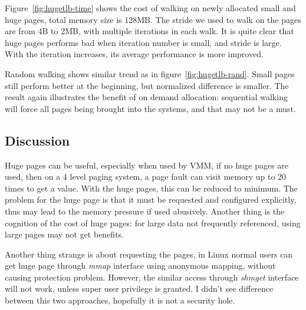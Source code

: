 Figure~\ref{fig:hugetlb-time} shows the cost of walking on newly allocated
small and huge pages, total memory size is 128MB. The stride we used to walk on
the pages are from 4B to 2MB, with multiple iterations in each walk. It is quite
clear that huge pages performs bad when iteration number is small, and stride
is large. With the iteration increases, its average performance is
more improved.

Random walking shows similar trend as in figure~\ref{fig:hugetlb-rand}. Small
pages still perform better at the beginning, but normalized difference is
smaller. The result again illustrates the benefit of on demand allocation:
sequential walking will force all pages being brought into the systems, and
that may not be a must.

\subsection{Discussion}
Huge pages can be useful, especially when used by VMM, if no huge pages are 
used, then on a 4 level paging system, a page fault can visit memory up to 20 times 
to get a value. With the huge pages, this can be reduced to minimum. The problem
for the huge page is that it must be requested and configured explicitly, thus
 may lead to the memory pressure if used abusively. Another thing is the cognition
 of the cost of huge pages: for large data not frequently referenced, using 
 large pages may not get benefits.

Another thing strange is about requesting the pages, in Linux normal users can
get huge page through \emph{mmap} interface using anonymous mapping, without
causing protection problem.  However, the similar access through \emph{shmget}
interface will not work, unless super user privilege is granted. I didn't see
difference between this two approaches, hopefully it is not a security hole.

